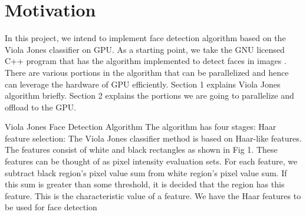 \section{Motivation}\label{sec:motivation}


In this project, we intend to implement face detection algorithm based on the Viola Jones classifier  on GPU. 
As a starting point, we take the GNU licensed C++ program that has the 
algorithm implemented to detect faces in images . 
There are various portions in the algorithm that can be parallelized and hence can leverage the hardware of GPU efficiently. 
Section 1 explains Viola Jones algorithm briefly. Section 2 explains the portions we are going to parallelize and offload to the GPU.


Viola Jones Face Detection Algorithm
The algorithm has four stages:
Haar feature selection: The Viola Jones classifier method is based on Haar-like features. 
The features consist of white and black rectangles as shown in Fig 1. 
These features can be thought of as pixel intensity evaluation sets. 
For each feature, we subtract black region’s pixel value sum from white region’s pixel value sum. 
If this sum is greater than some threshold, it is decided that the region has this feature. 
This is the characteristic value of a feature. We have the Haar features
to be used for face detection

